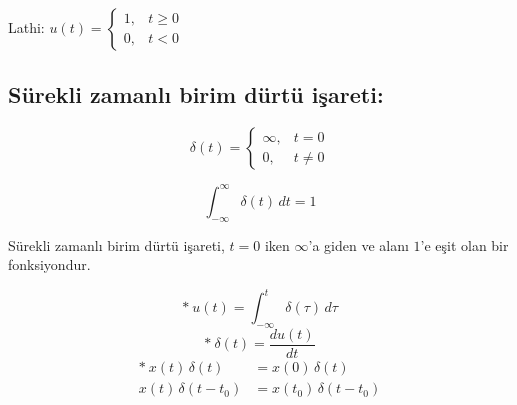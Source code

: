 \documentclass[11pt,a4paper]{article}
\begin{document}
\noindent
\begin{minipage}[c]{0.45\linewidth}
Lathi: \quad $u(t) = \begin{cases} 1, & t \geq 0 \\ 0, & t < 0 \end{cases}$
\end{minipage}\hfill
\begin{minipage}[c]{0.5\linewidth}
\centering
{}
\end{minipage}

\subsection{Sürekli zamanlı birim dürtü işareti:}
\noindent
\begin{minipage}[c]{0.36\linewidth}
\[ \delta(t) = \begin{cases} \infty, & t = 0 \\ 0, & t \neq 0 \end{cases} \]
\end{minipage}\hfill
\begin{minipage}[c]{0.3\linewidth}
\[ \int_{-\infty}^{\infty} \delta(t)\,dt = 1 \]
\end{minipage}\hfill
\begin{minipage}[c]{0.3\linewidth}
\centering
{}
\end{minipage}

\smallskip
Sürekli zamanlı birim dürtü işareti, $t=0$ iken $\infty$'a giden ve alanı $1$'e eşit olan bir fonksiyondur.

\[ \ast\ u(t) = \int_{-\infty}^{t} \delta(\tau)\,d\tau \]
\[ \ast\ \delta(t) = \frac{du(t)}{dt} \]
\begin{align*}
  \ast\ x(t)\,\delta(t) &= x(0)\,\delta(t) \\
  x(t)\,\delta(t-t_0) &= x(t_0)\,\delta(t-t_0)
\end{align*}
\end{document}
